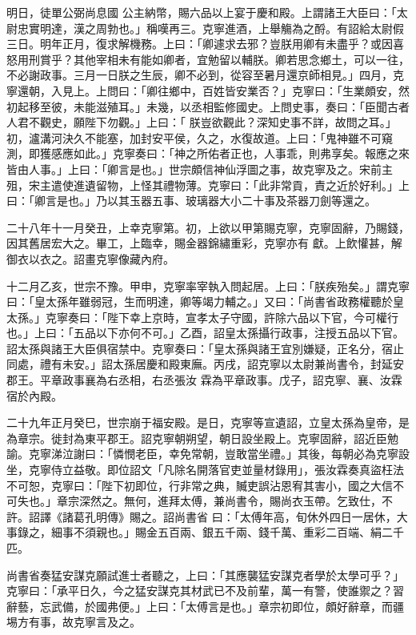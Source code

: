 \begin{pinyinscope}
 明日，徒單公弼尚息國
 公主納幣，賜六品以上宴于慶和殿。上謂諸王大臣曰：「太尉忠實明達，漢之周勃也。」稱嘆再三。克寧進酒，上舉觴為之酹。有詔給太尉假三日。明年正月，復求解機務。上曰：「卿遽求去邪？豈朕用卿有未盡乎？或因喜怒用刑賞乎？其他宰相未有能如卿者，宜勉留以輔朕。卿若思念鄉土，可以一往，不必謝政事。三月一日朕之生辰，卿不必到，從容至暑月還京師相見。」四月，克寧還朝，入見上。上問曰：「卿往鄉中，百姓皆安業否？」克寧曰：「生業頗安，然初起移至彼，未能滋殖耳。」未幾，以丞相監修國史。上問史事，奏曰：「臣聞古者人君不觀史，願陛下勿觀。」上曰：「
 朕豈欲觀此？深知史事不詳，故問之耳。」初，瀘溝河決久不能塞，加封安平侯，久之，水復故道。上曰：「鬼神雖不可窺測，即獲感應如此。」克寧奏曰：「神之所佑者正也，人事乖，則弗享矣。報應之來皆由人事。」上曰：「卿言是也。」世宗頗信神仙浮圖之事，故克寧及之。宋前主殂，宋主遣使進遺留物，上怪其禮物薄。克寧曰：「此非常貢，責之近於好利。」上曰：「卿言是也。」乃以其玉器五事、玻璃器大小二十事及茶器刀劍等還之。



 二十八年十一月癸丑，上幸克寧第。初，上欲以甲第賜克寧，克寧固辭，乃賜錢，因其舊居宏大之。畢工，上臨幸，賜金器錦繡重彩，克寧亦有
 獻。上飲懽甚，解御衣以衣之。詔畫克寧像藏內府。



 十二月乙亥，世宗不豫。甲申，克寧率宰執入問起居。上曰：「朕疾殆矣。」謂克寧曰：「皇太孫年雖弱冠，生而明達，卿等竭力輔之。」又曰：「尚書省政務權聽於皇太孫。」克寧奏曰：「陛下幸上京時，宣孝太子守國，許除六品以下官，今可權行也。」上曰：「五品以下亦何不可。」乙酉，詔皇太孫攝行政事，注授五品以下官。詔太孫與諸王大臣俱宿禁中。克寧奏曰：「皇太孫與諸王宜別嫌疑，正名分，宿止同處，禮有未安。」詔太孫居慶和殿東廡。丙戌，詔克寧以太尉兼尚書令，封延安郡王。平章政事襄為右丞相，右丞張汝
 霖為平章政事。戊子，詔克寧、襄、汝霖宿於內殿。



 二十九年正月癸巳，世宗崩于福安殿。是日，克寧等宣遺詔，立皇太孫為皇帝，是為章宗。徙封為東平郡王。詔克寧朝朔望，朝日設坐殿上。克寧固辭，詔近臣勉諭。克寧涕泣謝曰：「憐憫老臣，幸免常朝，豈敢當坐禮。」其後，每朝必為克寧設坐，克寧侍立益敬。即位詔文「凡除名開落官吏並量材錄用」，張汝霖奏真盜枉法不可恕，克寧曰：「陛下初即位，行非常之典，贓吏誤沾恩宥其害小，國之大信不可失也。」章宗深然之。無何，進拜太傅，兼尚書令，賜尚衣玉帶。乞致仕，不許。詔譯《諸葛孔明傳》賜之。詔尚書省
 曰：「太傅年高，旬休外四日一居休，大事錄之，細事不須親也。」賜金五百兩、銀五千兩、錢千萬、重彩二百端、絹二千匹。



 尚書省奏猛安謀克願試進士者聽之，上曰：「其應襲猛安謀克者學於太學可乎？」克寧曰：「承平日久，今之猛安謀克其材武已不及前輩，萬一有警，使誰禦之？習辭藝，忘武備，於國弗便。」上曰：「太傅言是也。」章宗初即位，頗好辭章，而疆埸方有事，故克寧言及之。




\end{pinyinscope}
